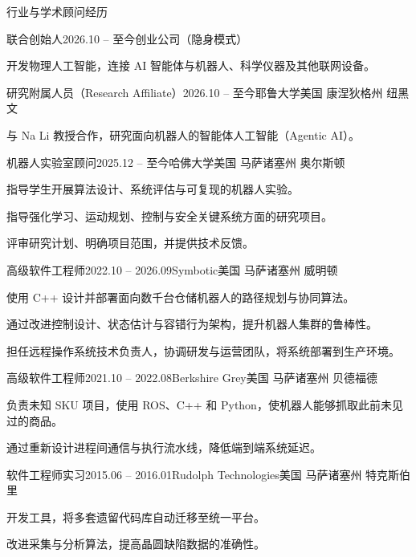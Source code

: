 \documentclass{resume}
\begin{document}
\begin{rSection}{行业与学术顾问经历}

\begin{rSubsection}{联合创始人}{2026.10 -- 至今}{创业公司（隐身模式）}{}
\item 开发物理人工智能，连接 AI 智能体与机器人、科学仪器及其他联网设备。
\end{rSubsection}

\begin{rSubsection}{研究附属人员（Research Affiliate）}{2026.10 -- 至今}{耶鲁大学}{美国 康涅狄格州 纽黑文}
\item 与 Na Li 教授合作，研究面向机器人的智能体人工智能（Agentic AI）。
\end{rSubsection}

\begin{rSubsection}{机器人实验室顾问}{2025.12 -- 至今}{哈佛大学}{美国 马萨诸塞州 奥尔斯顿}
\item 指导学生开展算法设计、系统评估与可复现的机器人实验。
\item 指导强化学习、运动规划、控制与安全关键系统方面的研究项目。
\item 评审研究计划、明确项目范围，并提供技术反馈。
\end{rSubsection}

\begin{rSubsection}{高级软件工程师}{2022.10 -- 2026.09}{Symbotic}{美国 马萨诸塞州 威明顿}
\item 使用 C++ 设计并部署面向数千台仓储机器人的路径规划与协同算法。
\item 通过改进控制设计、状态估计与容错行为架构，提升机器人集群的鲁棒性。
\item 担任远程操作系统技术负责人，协调研发与运营团队，将系统部署到生产环境。
\end{rSubsection}

\begin{rSubsection}{高级软件工程师}{2021.10 -- 2022.08}{Berkshire Grey}{美国 马萨诸塞州 贝德福德}
\item 负责未知 SKU 项目，使用 ROS、C++ 和 Python，使机器人能够抓取此前未见过的商品。
\item 通过重新设计进程间通信与执行流水线，降低端到端系统延迟。
\end{rSubsection}

\begin{rSubsection}{软件工程师实习}{2015.06 -- 2016.01}{Rudolph Technologies}{美国 马萨诸塞州 特克斯伯里}
\item 开发工具，将多套遗留代码库自动迁移至统一平台。
\item 改进采集与分析算法，提高晶圆缺陷数据的准确性。
\end{rSubsection}


\end{rSection}
\end{document}
